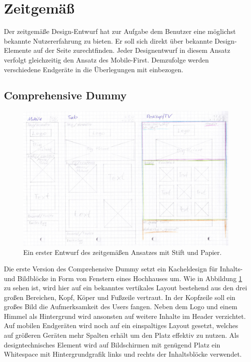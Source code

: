 \section{Zeitgemäß}
Der zeitgemäße Design-Entwurf hat zur Aufgabe dem Benutzer eine möglichst bekannte Nutzererfahrung zu bieten. Er soll sich direkt über bekannte Design-Elemente auf der Seite zurechtfinden. 
Jeder Designentwurf in diesem Ansatz verfolgt gleichzeitig den Ansatz des Mobile-First. Demzufolge werden verschiedene Endgeräte in die Überlegungen mit einbezogen.

\subsection{Comprehensive Dummy}
\begin{figure} [hp]
	\includegraphics[width=\textwidth]{./img/zeitg_comp1.jpg}
	\caption{Ein erster Entwurf des zeitgemäßen Ansatzes mit Stift und Papier.}
	\label{zeitg:Comp1}
\end{figure}

Die erste Version des Comprehensive Dummy setzt ein Kacheldesign für Inhalts- und Bildblöcke in Form von Fenstern eines Hochhauses um. Wie in Abbildung \ref{zeitg:Comp1} zu sehen ist, wird hier auf ein bekanntes vertikales Layout bestehend aus den drei großen Bereichen, Kopf, Köper und Fußzeile vertraut. In der Kopfzeile soll ein großes Bild die Aufmerksamkeit des Users fangen. Neben dem Logo und einem Himmel als Hintergrund wird ansonsten auf weitere Inhalte im Header verzichtet. Auf mobilen Endgeräten wird noch auf ein einspaltiges Layout gesetzt, welches auf größeren Geräten mehr Spalten erhält um den Platz effektiv zu nutzen. Als designtechnisches Element wird auf Bildschirmen mit genügend Platz ein Whitespace mit Hintergrundgrafik links und rechts der Inhaltsblöcke verwendet.

